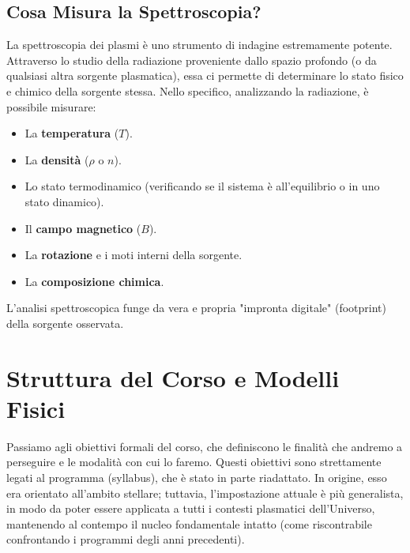     \subsection{Cosa Misura la Spettroscopia?}
    La spettroscopia dei plasmi è uno strumento di indagine estremamente potente. Attraverso lo studio della radiazione proveniente dallo spazio profondo (o da qualsiasi altra sorgente plasmatica), essa ci permette di determinare lo stato fisico e chimico della sorgente stessa. Nello specifico, analizzando la radiazione, è possibile misurare:\begin{itemize}\item La \textbf{temperatura} ($T$).\item La \textbf{densità} ($\rho$ o $n$).\item Lo stato termodinamico (verificando se il sistema è all'equilibrio o in uno stato dinamico).\item Il \textbf{campo magnetico} ($B$).\item La \textbf{rotazione} e i moti interni della sorgente.\item La \textbf{composizione chimica}.\end{itemize}L'analisi spettroscopica funge da vera e propria "impronta digitale" (footprint) della sorgente osservata.
    
\section{Struttura del Corso e Modelli Fisici}
Passiamo agli obiettivi formali del corso, che definiscono le finalità che andremo a perseguire e le modalità con cui lo faremo. Questi obiettivi sono strettamente legati al programma (syllabus), che è stato in parte riadattato. In origine, esso era orientato all'ambito stellare; tuttavia, l'impostazione attuale è più generalista, in modo da poter essere applicata a tutti i contesti plasmatici dell'Universo, mantenendo al contempo il nucleo fondamentale intatto (come riscontrabile confrontando i programmi degli anni precedenti).

